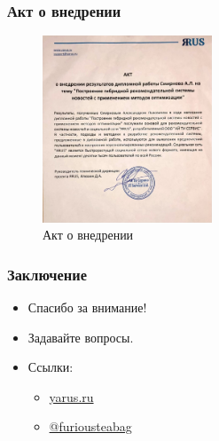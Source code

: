\documentclass[xetex,mathserif,serif]{beamer}
\begin{document}
\begin{frame}
	\frametitle{Акт о внедрении}

    \begin{figure}[h]
        \includegraphics[width=0.45\textwidth]{./images/akt.jpg}
        \caption{Акт о внедрении}
        \label{fig:akt}
        \centering
    \end{figure}

\end{frame}

\begin{frame}
	\frametitle{Заключение}


    \begin{itemize}
        \item Спасибо за внимание!
        \item Задавайте вопросы.
    \end{itemize}

    \begin{itemize}
        \item Ссылки:
            \begin{itemize}
                \item \href{https://yarus.ru/}{yarus.ru}
                \item \href{https://t.me/furiousteabag}{@furiousteabag}
            \end{itemize}
    \end{itemize}


\end{frame}
\end{document}
